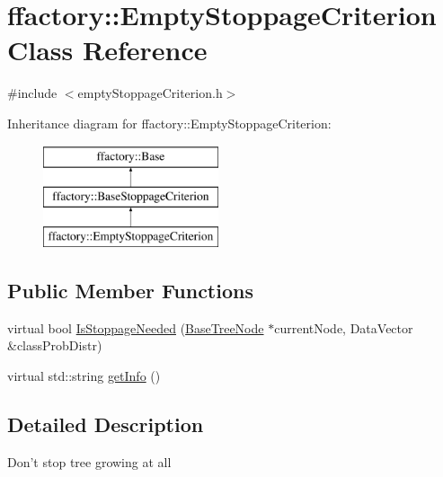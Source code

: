 \hypertarget{classffactory_1_1_empty_stoppage_criterion}{\section{ffactory\-:\-:Empty\-Stoppage\-Criterion Class Reference}
\label{classffactory_1_1_empty_stoppage_criterion}
}


{\ttfamily \#include $<$empty\-Stoppage\-Criterion.\-h$>$}

Inheritance diagram for ffactory\-:\-:Empty\-Stoppage\-Criterion\-:\begin{figure}[H]
\begin{center}
\leavevmode
\includegraphics[height=3.000000cm]{classffactory_1_1_empty_stoppage_criterion}
\end{center}
\end{figure}
\subsection*{Public Member Functions}
\begin{DoxyCompactItemize}
\item 
virtual bool \hyperlink{classffactory_1_1_empty_stoppage_criterion_a5dca6353a6a813e09c77b53db8e57fd9}{Is\-Stoppage\-Needed} (\hyperlink{classffactory_1_1_base_tree_node}{Base\-Tree\-Node} $\ast$current\-Node, Data\-Vector \&class\-Prob\-Distr)
\item 
virtual std\-::string \hyperlink{classffactory_1_1_empty_stoppage_criterion_a19181caac08aad7d05fcc07307c93c70}{get\-Info} ()
\end{DoxyCompactItemize}


\subsection{Detailed Description}
Don't stop tree growing at all 

